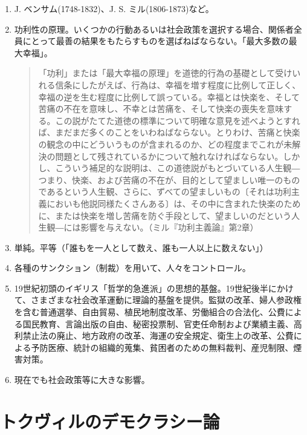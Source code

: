 \documentclass[uplatex,dvipdfmx]{jsarticle}
\begin{document}
\begin{enumerate}
\item J. ベンサム(1748-1832)、J. S. ミル(1806-1873)など。

 \item 功利性の原理。いくつかの行動あるいは社会政策を選択する場合、関係者全員にとって最善の結果をもたらすものを選ばねばならない。「最大多数の最大幸福」。

   \begin{quote}\small{}

     「功利」または「最大幸福の原理」を道徳的行為の基礎として受けいれる信条にしたがえば、行為は、幸福を増す程度に比例して正しく、幸福の逆を生む程度に比例して誤っている。幸福とは快楽を、そして苦痛の不在を意味し、不幸とは苦痛を、そして快楽の喪失を意味する。この説がたてた道徳の標準について明確な意見を述べようとすれば、まだまだ多くのことをいわねばならない。とりわけ、苦痛と快楽の観念の中にどういうものが含まれるのか、どの程度までこれが未解決の問題として残されているかについて触れなければならない。しかし、こういう補足的な説明は、この道徳説がもとづいている人生観{\――}つまり、快楽、および苦痛の不在が、目的として望ましい唯一のものであるという人生観、さらに、ずべての望ましいもの〔それは功利主義においも他説同様たくさんある〕は、その中に含まれた快楽のために、または快楽を増し苦痛を防ぐ手段として、望ましいのだという人生観{\――}には影響を与えない。（ミル『功利主義論』第2章）

   \end{quote}

 \item 単純。平等（「誰もを一人として数え、誰も一人以上に数えない」）

 \item 各種のサンクション（制裁）を用いて、人々をコントロール。

 \item 19世紀初頭のイギリス「哲学的急進派」の思想的基盤。19世紀後半にかけて、さまざまな社会改革運動に理論的基盤を提供。監獄の改革、婦人参政権を含む普通選挙、自由貿易、植民地制度改革、労働組合の合法化、公費による国民教育、言論出版の自由、秘密投票制、官吏任命制および業績主義、高利禁止法の廃止、地方政府の改革、海運の安全規定、衛生上の改革、公費による予防医療、統計の組織的蒐集、貧困者のための無料裁判、産児制限、煙害対策。

\item 現在でも社会政策等に大きな影響。

\end{enumerate}


\section{トクヴィルのデモクラシー論}
\end{document}
